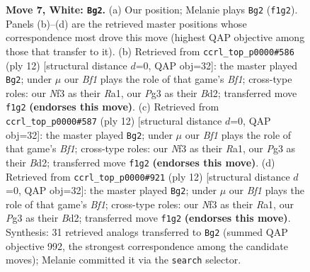 \documentclass[11pt]{article}
\begin{document}
\begin{figure}[p]
\caption{\textbf{Move 7, White: \texttt{Bg2}.} (a) Our position; Melanie plays \texttt{Bg2} (\texttt{f1g2}). Panels (b)--(d) are the retrieved master positions whose correspondence most drove this move (highest QAP objective among those that transfer to it). (b) Retrieved from \texttt{ccrl\_top\_p0000\#586} (ply 12) [structural distance $d$=0, QAP obj=32]: the master played \texttt{Bg2}; under $\mu$ our \emph{Bf1} plays the role of that game's \emph{Bf1}; cross-type roles: our \emph{N}f3 as their \emph{R}a1, our \emph{P}g3 as their \emph{B}d2; transferred move \texttt{f1g2} \textbf{(endorses this move)}. (c) Retrieved from \texttt{ccrl\_top\_p0000\#587} (ply 12) [structural distance $d$=0, QAP obj=32]: the master played \texttt{Bg2}; under $\mu$ our \emph{Bf1} plays the role of that game's \emph{Bf1}; cross-type roles: our \emph{N}f3 as their \emph{R}a1, our \emph{P}g3 as their \emph{B}d2; transferred move \texttt{f1g2} \textbf{(endorses this move)}. (d) Retrieved from \texttt{ccrl\_top\_p0000\#921} (ply 12) [structural distance $d$=0, QAP obj=32]: the master played \texttt{Bg2}; under $\mu$ our \emph{Bf1} plays the role of that game's \emph{Bf1}; cross-type roles: our \emph{N}f3 as their \emph{R}a1, our \emph{P}g3 as their \emph{B}d2; transferred move \texttt{f1g2} \textbf{(endorses this move)}. Synthesis: 31 retrieved analogs transferred to \texttt{Bg2} (summed QAP objective 992, the strongest correspondence among the candidate moves); Melanie committed it via the \texttt{search} selector.}
\label{fig:thought-m12}
\end{figure}

\clearpage
\end{document}
